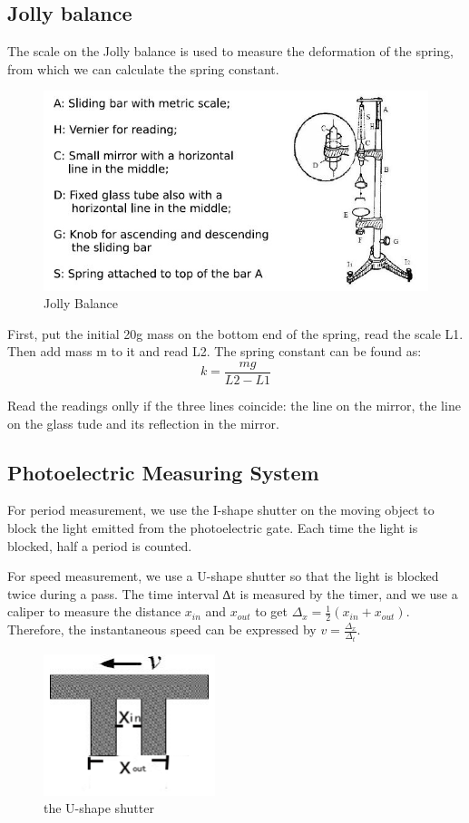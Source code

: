 \documentclass[12pt,a4paper]{article}
\begin{document}
\subsection{Jolly balance}
The scale on the Jolly balance is used to measure the deformation of the spring, from which we can calculate the spring constant.
\begin{figure}[H]
    \centering
    \includegraphics[width=12cm]{jollybalance.png}
    \caption{Jolly Balance}
    \label{jolly}
\end{figure}

First, put the initial 20g mass on the bottom end of the spring, read the scale L1. Then add mass m to it and read L2. The spring constant can be found as:
$$k=\frac{mg}{L2-L1}$$\par
Read the readings onlly if the three lines coincide: the line on the mirror, the line on the glass tude and its reflection in the mirror.

\subsection{Photoelectric Measuring System}
For period measurement, we use the I-shape shutter on the moving object to block the light emitted from the photoelectric gate. Each time the light is blocked, half a period is counted.\par 
For speed measurement, we use a U-shape shutter so that the light is blocked twice during a pass. The time interval ∆t is measured by the timer, and we use a caliper to measure the distance $x_{in}$ and $x_{out}$  to get $\Delta_x=\frac{1}{2}(x_{in}+x_{out})$. Therefore, the instantaneous speed can be expressed by $v=\frac{\Delta_x}{\Delta_t}$.

\begin{figure}[H]
    \centering
    \includegraphics[width=5cm]{ushape.png}
    \caption{the U-shape shutter}
\end{figure}
\end{document}
